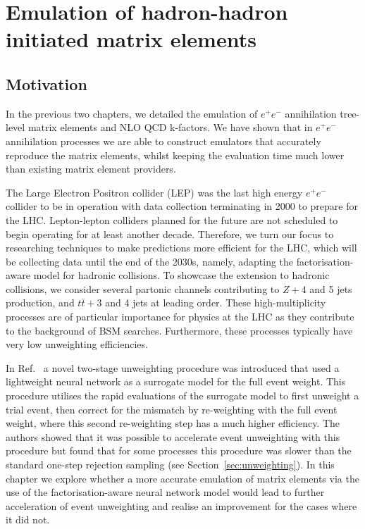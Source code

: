 \documentclass[main.tex]{subfiles}
\begin{document}
\chapter{Emulation of hadron-hadron initiated matrix elements}
\label{chapter:fame3}

\section{Motivation}
In the previous two chapters, we detailed the emulation of $e^{+}e^{-}$
annihilation tree-level matrix elements and NLO QCD k-factors. We
have shown that in $e^{+}e^{-}$ annihilation processes we are able to
construct emulators that accurately reproduce the matrix elements,
whilst keeping the evaluation time much lower than existing matrix
element providers.

The Large Electron Positron collider (LEP) was the last high energy
$e^{+}e^{-}$ collider to be in operation with data collection
terminating in 2000 to prepare for the LHC. Lepton-lepton colliders
planned for the future \cite{Faus-Golfe:2022cgm} are not scheduled
to begin operating for at least another decade. Therefore, we turn
our focus to researching techniques to make predictions more efficient
for the LHC, which will be collecting data until the end of the 2030s,
namely, adapting the factorisation-aware model for hadronic collisions.
To showcase the extension to hadronic collisions, we consider several
partonic channels contributing to $Z+4$ and 5 jets production,
and $t\bar{t}+3$ and 4 jets at leading order. These high-multiplicity
processes are of particular importance for physics at the LHC as
they contribute to the background of BSM searches. Furthermore,
these processes typically have very low unweighting efficiencies.

In Ref.~\cite{Danziger:2021eeg} a novel two-stage unweighting
procedure was introduced that used a lightweight neural network
as a surrogate model for the full event weight. This procedure utilises
the rapid evaluations of the surrogate model to first unweight a trial event,
then correct for the mismatch by re-weighting with the full event weight,
where this second re-weighting step has a much higher efficiency.
The authors showed that it was possible to accelerate event unweighting
with this procedure but found that for some processes this procedure
was slower than the standard one-step rejection sampling
(see Section~\ref{sec:unweighting}). In this chapter
we explore whether a more accurate emulation of matrix elements via
the use of the factorisation-aware neural network model would lead
to further acceleration of event unweighting and realise an improvement
for the cases where it did not.
\end{document}
